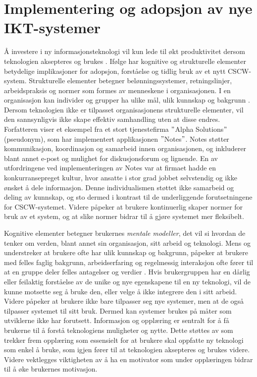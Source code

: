 \section{Implementering og adopsjon av nye IKT-systemer}
\label{sec:implementering}
Å investere i ny informasjonsteknologi vil kun lede til økt produktivitet dersom teknologien aksepteres og brukes \citep{Venkatesh99}. Ifølge \citet{Orlikowski92} har kognitive og strukturelle elementer betydelige implikasjoner for adopsjon, forståelse og tidlig bruk av et nytt CSCW-system. Strukturelle elementer betegner belønningssystemer, retningslinjer, arbeidspraksis og normer som formes av menneskene i organisasjonen. I en organisasjon kan individer og grupper ha ulike mål, ulik kunnskap og bakgrunn \citep{Ackermann00}. Dersom teknologien ikke er tilpasset organisasjonens strukturelle elementer, vil den sannsynligvis ikke skape effektiv samhandling uten at disse endres. Forfatteren viser et eksempel fra et stort tjenestefirma $"$Alpha Solutions$"$ (pseudonym), som har implementert applikasjonen $"$Notes$"$. Notes støtter kommunikasjon, koordinasjon og samarbeid innen organisasjonen, og inkluderer blant annet e-post og mulighet for diskusjonsforum og lignende. En av utfordringene ved implementeringen av Notes var at firmaet hadde en konkurransepreget kultur, hvor ansatte i stor grad jobbet selvstendig og ikke ønsket å dele informasjon. Denne individualismen støttet ikke samarbeid og deling av kunnskap, og sto dermed i kontrast til de underliggende forutsetningene for CSCW-systemet. Videre påpeker \citet{Ackermann00} at brukere kontinuerlig skaper normer for bruk av et system, og at slike normer bidrar til å gjøre systemet mer fleksibelt.
 
\noindent
Kognitive elementer betegner brukernes \textit{mentale modeller}, det vil si hvordan de tenker om verden, blant annet sin organisasjon, sitt arbeid og teknologi. Mens \citet{Berg99} og \citet{Ackermann} understreker at brukere ofte har ulik kunnskap og bakgrunn, påpeker \citep{Orlikowski92} at brukere med felles faglig bakgrunn, arbeidserfaring og regelmessig interaksjon ofte fører til at en gruppe deler felles antagelser og verdier . Hvis brukergruppen har en dårlig eller feilaktig forståelse av de unike og nye egenskapene til en ny teknologi, vil de kunne motsette seg å bruke den, eller velge å ikke integrere den i sitt arbeid. Videre påpeker \citet{Ackermann00} at brukere ikke bare tilpasser seg nye systemer, men at de også tilpasser systemet til sitt bruk. Dermed kan systemer brukes på måter som utviklerne  ikke har forutsett. Informasjon og opplæring er sentralt for å få brukerne til å forstå teknologiens muligheter og nytte. Dette støttes av \citet{Venkatesh99} som trekker frem opplæring som essensielt for at brukere skal oppfatte ny teknologi som enkel å bruke, som igjen fører til at teknologien aksepteres og brukes videre. Videre vektlegges viktigheten av å ha en motivator som under opplæringen bidrar til å øke brukernes motivasjon.
 
